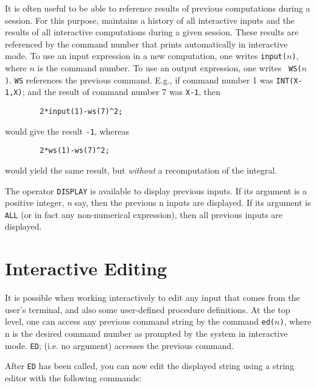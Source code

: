 It is often useful to be able to reference results of previous
computations during a {\REDUCE} session.  For this purpose, {\REDUCE}
maintains a history of all interactive inputs and the
results of all interactive computations during a given session.  These
results are referenced by the command number that {\REDUCE} prints
automatically in interactive mode.  To use an input expression in a new
computation, one writes {\tt input(}$n${\tt )}, where
$n$ is the command number.  To use an output expression, one writes {\tt
WS(}$n${\tt )}. {\tt WS} references the previous command.
E.g., if command number 1 was {\tt INT(X-1,X)}; and the result of command
number 7 was {\tt X-1}, then
\begin{verbatim}
        2*input(1)-ws(7)^2;
\end{verbatim}
would give the result {\tt -1}, whereas
\begin{verbatim}
        2*ws(1)-ws(7)^2;
\end{verbatim}
would yield the same result, but {\em without\/} a recomputation of the
integral.

The operator {\tt DISPLAY} is available to display previous
inputs.  If its argument is a positive integer, {\it n} say, then the
previous n inputs are displayed.  If its argument is {\tt ALL} (or in fact
any non-numerical expression), then all previous inputs are displayed.

\section{Interactive Editing}
It is possible when working interactively to edit any {\REDUCE} input that
comes from the user's terminal, and also some user-defined procedure
definitions.  At the top level, one can access any previous command string
by the command {\tt ed(}$n${\tt )}, where n is the desired
command number as prompted by the system in interactive mode. {\tt ED};
(i.e. no argument) accesses the previous command.

After {\tt ED} has been called, you can now edit the displayed string using a
string editor with the following commands:

